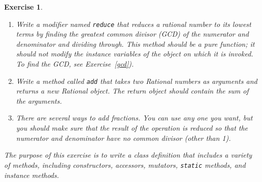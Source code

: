 \documentclass[12pt]{book}
\theoremstyle{exercise}
\newtheorem{exercise}{Exercise}[chapter]
\newcommand{\java}[1]{\lstinline{#1}} %
\begin{document}
\begin{exercise}
\begin{enumerate}
\item Write a modifier named \java{reduce} that reduces a rational number to its lowest terms by finding the greatest common divisor (GCD) of the numerator and denominator and dividing through.
This method should be a pure function; it should not modify the instance variables of the object on which it is invoked.
To find the GCD, see Exercise~\ref{gcd}).

\item Write a method called \java{add} that takes two Rational numbers as arguments and returns a new Rational object.
The return object should contain the sum of the arguments.

\item There are several ways to add fractions.
You can use any one you want, but you should make sure that the result of the operation is reduced so that the numerator and denominator have no common divisor (other than 1).
\end{enumerate}

The purpose of this exercise is to write a class definition that includes a variety of methods, including constructors, accessors, mutators, \java{static} methods, and instance methods.
\end{exercise}
\end{document}
